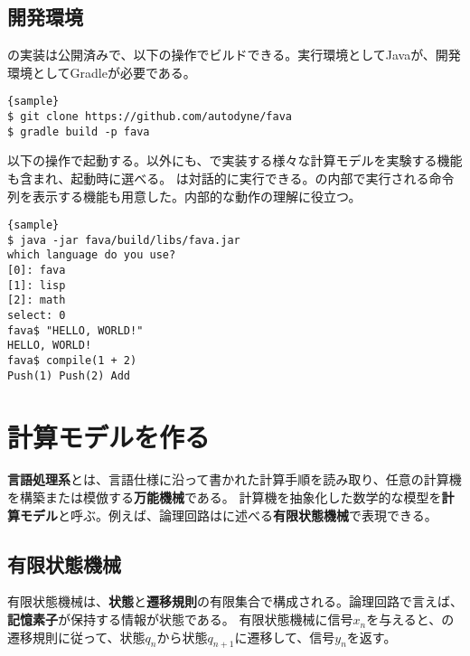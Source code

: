 \documentclass[10pt,a4paper]{book}
\begin{document}
\section{開発環境}

\fava{}の実装は公開済みで、以下の操作でビルドできる。実行環境としてJavaが、開発環境としてGradleが必要である。

\begin{Verbatim}{sample}
$ git clone https://github.com/autodyne/fava
$ gradle build -p fava
\end{Verbatim}

以下の操作で起動する。\fava{}以外にも、で実装する様々な計算モデルを実験する機能も含まれ、起動時に選べる。
\fava{}は対話的に実行できる。\fava{}の内部で実行される命令列を表示する機能も用意した。内部的な動作の理解に役立つ。

\begin{Verbatim}{sample}
$ java -jar fava/build/libs/fava.jar
which language do you use?
[0]: fava
[1]: lisp
[2]: math
select: 0
fava$ "HELLO, WORLD!"
HELLO, WORLD!
fava$ compile(1 + 2)
Push(1) Push(2) Add
\end{Verbatim}

\chapter{計算モデルを作る\label{chap:automata}}

\textbf{言語処理系}とは、言語仕様に沿って書かれた計算手順を読み取り、任意の計算機を構築または模倣する\textbf{万能機械}である。
計算機を抽象化した数学的な模型を\textbf{計算モデル}と呼ぶ。例えば、論理回路はに述べる\textbf{有限状態機械}で表現できる。

\section{有限状態機械\label{sect:regex}}

有限状態機械は、\textbf{状態}と\textbf{遷移規則}の有限集合で構成される。論理回路で言えば、\textbf{記憶素子}が保持する情報が状態である。
有限状態機械に信号$x_n$を与えると、の遷移規則に従って、状態$q_n$から状態$q_{n+1}$に遷移して、信号$y_n$を返す。
\end{document}
